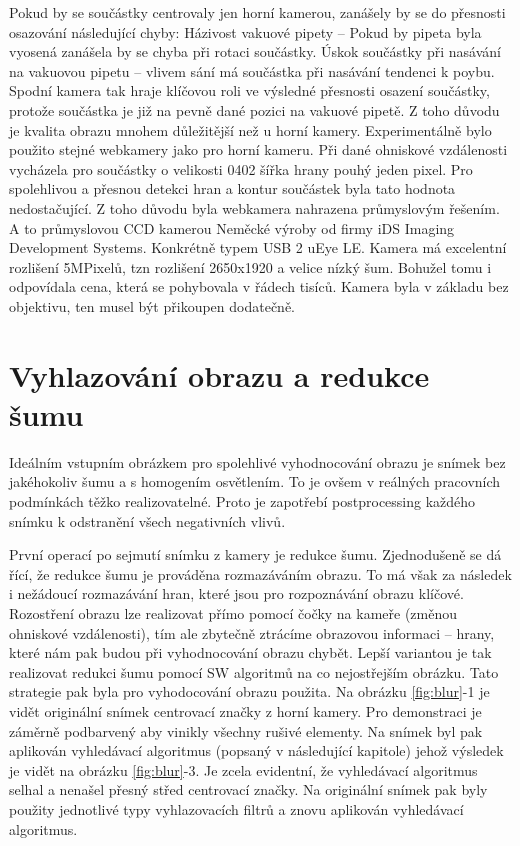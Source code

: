 Pokud by se součástky centrovaly jen horní kamerou, zanášely by se do přesnosti osazování následující chyby:
Házivost vakuové pipety – Pokud by pipeta byla vyosená zanášela by se chyba při rotaci součástky.
Úskok součástky při nasávání na vakuovou pipetu – vlivem sání má součástka při nasávání tendenci k poybu.
Spodní kamera tak hraje klíčovou roli ve výsledné přesnosti osazení součástky, protože součástka je již na pevně dané pozici na vakuové pipetě. 
Z toho důvodu je kvalita obrazu mnohem důležitější než u horní kamery.  Experimentálně bylo použito stejné webkamery jako pro horní kameru. Při dané ohniskové vzdálenosti vycházela pro součástky o velikosti 0402 šířka hrany pouhý jeden pixel. Pro spolehlivou a přesnou detekci hran a kontur součástek byla tato hodnota nedostačující. Z toho důvodu byla webkamera nahrazena průmyslovým řešením. A to průmyslovou CCD kamerou Neměcké výroby od firmy iDS Imaging Development Systems. Konkrétně typem USB 2 uEye LE. Kamera má excelentní rozlišení 5MPixelů, tzn rozlišení 2650x1920 a velice nízký šum. Bohužel tomu i odpovídala cena, která se pohybovala v řádech tisíců. Kamera byla v základu bez objektivu, ten musel být přikoupen dodatečně.


\section{Vyhlazování obrazu a redukce šumu}
Ideálním vstupním obrázkem pro spolehlivé vyhodnocování obrazu je snímek bez jakéhokoliv šumu a s homogením osvětlením. To je ovšem v reálných pracovních podmínkách těžko realizovatelné. Proto je zapotřebí postprocessing každého snímku k odstranění všech negativních vlivů.


První operací po sejmutí snímku z kamery je redukce šumu. Zjednodušeně se dá řící, že redukce šumu je prováděna rozmazáváním obrazu. To má však za následek i nežádoucí rozmazávání hran, které jsou pro rozpoznávání obrazu klíčové. Rozostření obrazu lze realizovat přímo pomocí čočky na kameře (změnou ohniskové vzdálenosti), tím ale zbytečně ztrácíme obrazovou informaci – hrany, které nám pak budou při vyhodnocování obrazu chybět. Lepší variantou je tak realizovat redukci šumu pomocí SW algoritmů na co nejostřejším obrázku. Tato strategie pak byla pro vyhodocování obrazu použita. Na obrázku \ref{fig:blur}-1 je vidět originální snímek centrovací značky z horní kamery. Pro demonstraci je záměrně podbarvený aby vinikly všechny rušivé elementy. Na snímek byl pak aplikován vyhledávací algoritmus (popsaný v následující kapitole) jehož výsledek je vidět na obrázku \ref{fig:blur}-3.  Je zcela evidentní, že vyhledávací algoritmus selhal a nenašel přesný střed  centrovací značky. Na originální snímek pak byly použity jednotlivé typy vyhlazovacích filtrů a znovu aplikován vyhledávací algoritmus. 

